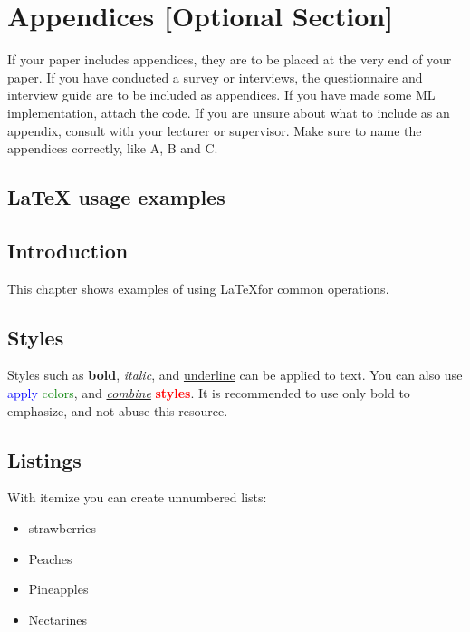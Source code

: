 \section{Appendices [Optional Section]}
\label{chap:appendices}

If your paper includes appendices, they are to be placed at the very end of your paper. If you have conducted a survey or interviews, the questionnaire and interview guide are to be included as appendices. If you have made some ML implementation, attach the code. If you are unsure about what to include as an appendix, consult with your lecturer or supervisor. Make sure to name the appendices correctly, like A, B and C.

\subsection{LaTeX usage examples}


\subsection{Introduction}
This chapter shows examples of using \LaTeX for common operations. 

\subsection{Styles}
\label{sec:styles}
Styles such as \textbf{bold}, \textit{italic}, and \underline{underline} can be applied to text. You can also use \textcolor{red}{} \textcolor{blue}{apply} \textcolor{green}{colors}, and \underline{\textit{combine}} \textbf{\textcolor{red}{styles}}. It is recommended to use only bold to emphasize, and not abuse this resource.

\subsection{Listings}
With itemize you can create unnumbered lists:

\begin{itemize}
     \item strawberries
     \item Peaches
     \item Pineapples
     \item Nectarines
\end{itemize}


